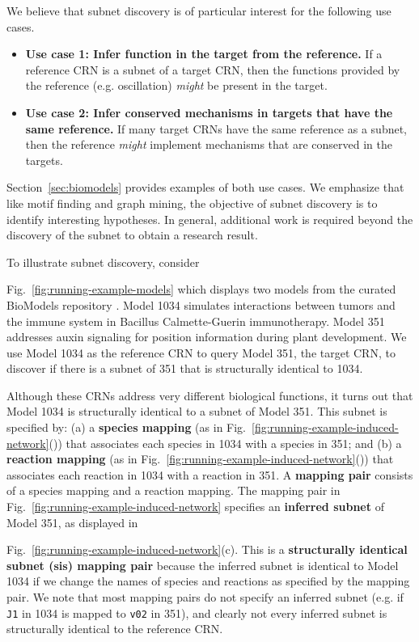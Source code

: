 \documentclass[webpdf,contemporary,large]{oup-authoring-template}
\newcommand{\revisionb}[1]{\color{red}{#1}\color{black}}
\newcommand{\fig}[1]{
  Fig.~\ref{#1}}
\newcommand{\secref}[1]{Section~\ref{#1}}
\theoremstyle{thmstyleone}%
\theoremstyle{thmstyletwo}%
\theoremstyle{thmstylethree}%
\begin{document}
We believe that subnet discovery is of particular interest for the following use cases.
\begin{itemize}
\item {\bf Use case 1: Infer function in the target from the reference.}
If a reference CRN is a subnet of a target CRN, then 
the functions provided by the reference (e.g. oscillation) {\em might} be present in the target.
\item {\bf Use case 2: Infer conserved mechanisms in targets that have the same reference.}
If many target CRNs
have the same reference as a subnet, then the reference {\em might} implement mechanisms that are conserved in the targets.
\end{itemize}
\secref{sec:biomodels} provides examples of both use cases.
We emphasize that like motif finding and graph mining, the objective of subnet discovery is to identify interesting hypotheses.
In general, additional work is required beyond the discovery of the subnet to obtain a research result.


To illustrate subnet discovery, consider
\fig{fig:running-example-models} which
displays two models from the curated BioModels repository \citep{li_biomodels_2010}.
Model 1034 simulates interactions between tumors and the immune system in Bacillus Calmette-Guerin immunotherapy.
Model 351 addresses auxin signaling for position information during plant development.
We use Model 1034 as the reference CRN to query Model 351, the
target CRN, to discover if there is a subnet of 351 that is structurally identical to 1034.

Although these CRNs address very different biological functions, it turns out that Model 1034 is structurally identical to a subnet of Model 351.
This subnet is specified by: (a) a {\bf species mapping}
(as in \fig{fig:running-example-induced-network}(\revisionb{b}))
that associates each species in 1034 with
a species in 351; and
(b)  a {\bf reaction mapping}
(as in \fig{fig:running-example-induced-network}(\revisionb{a}))
that associates each reaction in 1034 with
a reaction in 351.
A {\bf mapping pair} consists of a species mapping and a reaction mapping.
The mapping pair in \fig{fig:running-example-induced-network}
specifies an {\bf inferred subnet} of Model 351, as displayed in
\fig{fig:running-example-induced-network}(c).
This is a {\bf structurally identical subnet (sis) mapping pair} because the inferred subnet
is identical to Model 1034 if we change the names of species and reactions as specified by the mapping pair.
We note that most mapping pairs do not specify an inferred subnet
(e.g. if \texttt{J1} in 1034 is mapped to \texttt{v02} in 351), and clearly
not every inferred subnet is structurally identical
to the reference CRN.
\end{document}
